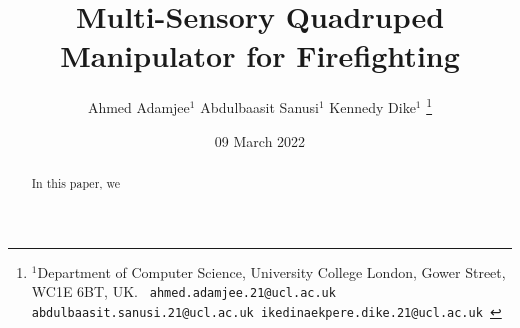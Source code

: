 \documentclass[a4paper, 10pt, conference]{ieeeconf}      %
\title{\LARGE \bf
Multi-Sensory Quadruped Manipulator for Firefighting
}
\author{Ahmed Adamjee$^{1}$ Abdulbaasit Sanusi$^{1}$ Kennedy Dike$^{1}$ %
\thanks{$^{1}$Department of Computer Science, University College London, Gower Street, WC1E 6BT, UK.
{\tt\small
{{ahmed.adamjee.21}@ucl.ac.uk}
{{abdulbaasit.sanusi.21}@ucl.ac.uk}
{{ikedinaekpere.dike.21}@ucl.ac.uk}
}}}
\date{09 March 2022} %
\begin{document}
\maketitle
\thispagestyle{empty}
\pagestyle{empty}

\begin{abstract}
In this paper, we 
\end{abstract}










\end{document}
